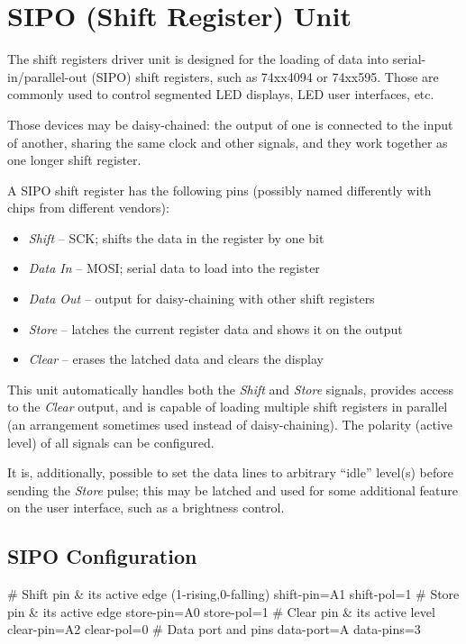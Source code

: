 \section{SIPO (Shift Register) Unit}

The shift registers driver unit is designed for the loading of data into serial-in/parallel-out (SIPO) shift registers, such as 74xx4094 or 74xx595. Those are commonly used to control segmented LED displays, LED user interfaces, etc. 

Those devices may be daisy-chained: the output of one is connected to the input of another, sharing the same clock and other signals, and they work together as one longer shift register.

A SIPO shift register has the following pins (possibly named differently with chips from different vendors):

\begin{itemize}
	\item \textit{Shift} -- \gls{SCK}; shifts the data in the register by one bit
	\item \textit{Data In} -- \gls{MOSI}; serial data to load into the register
	\item \textit{Data Out} -- output for daisy-chaining with other shift registers
	\item \textit{Store} -- latches the current register data and shows it on the output
	\item \textit{Clear} -- erases the latched data and clears the display
\end{itemize}

This unit automatically handles both the \textit{Shift} and \textit{Store} signals, provides access to the \textit{Clear} output, and is capable of loading multiple shift registers in parallel (an arrangement sometimes used instead of daisy-chaining). The polarity (active level) of all signals can be configured.

It is, additionally, possible to set the data lines to arbitrary ``idle'' level(s) before sending the \textit{Store} pulse; this may be latched and used for some additional feature on the user interface, such as a brightness control.


\subsection{SIPO Configuration}

\begin{inicode}
# Shift pin & its active edge (1-rising,0-falling)
shift-pin=A1
shift-pol=1
# Store pin & its active edge
store-pin=A0
store-pol=1
# Clear pin & its active level
clear-pin=A2
clear-pol=0
# Data port and pins
data-port=A
data-pins=3
\end{inicode}

